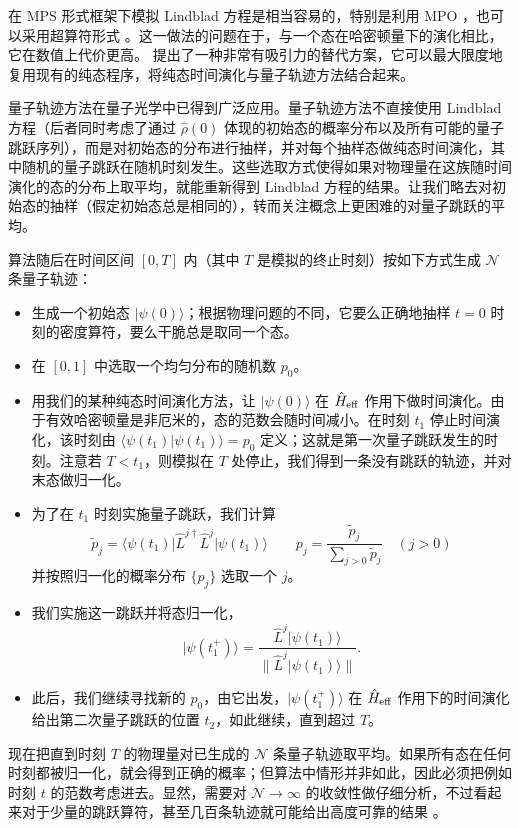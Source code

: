 \documentclass[a4paper,10pt,oneside,onecolumn,1p,times]{elsarticle}
\newcommand{\bra}[1]{\mbox{$\langle #1  |$}}
\newcommand{\ket}[1]{\mbox{$| #1  \rangle$}}
\newcommand{\braket}[2]{\mbox{$\langle #1  | #2 \rangle$}} 	%
\begin{document}
在 MPS 形式框架下模拟 Lindblad 方程是相当容易的，特别是利用 MPO \cite{VerstraeteRipoll04}，也可以采用超算符形式 \cite{VidalZwolak04}。这一做法的问题在于，与一个态在哈密顿量下的演化相比，它在数值上代价更高。\cite{Daley09} 提出了一种非常有吸引力的替代方案，它可以最大限度地复用现有的纯态程序，将纯态时间演化与量子轨迹方法结合起来。

量子轨迹方法在量子光学中已得到广泛应用\cite{Plenio98}。量子轨迹方法不直接使用 Lindblad 方程（后者同时考虑了通过 $\hat{\rho}(0)$ 体现的初始态的概率分布以及所有可能的量子跳跃序列），而是对初始态的分布进行抽样，并对每个抽样态做纯态时间演化，其中随机的量子跳跃在随机时刻发生。这些选取方式使得如果对物理量在这族随时间演化的态的分布上取平均，就能重新得到 Lindblad 方程的结果。让我们略去对初始态的抽样（假定初始态总是相同的），转而关注概念上更困难的对量子跳跃的平均。

算法随后在时间区间 $[0,T]$ 内（其中 $T$ 是模拟的终止时刻）按如下方式生成 ${\mathcal N}$ 条量子轨迹：
\begin{itemize}
\item 生成一个初始态 $\ket{\psi(0)}$；根据物理问题的不同，它要么正确地抽样 $t=0$ 时刻的密度算符，要么干脆总是取同一个态。
\item 在 $[0,1]$ 中选取一个均匀分布的随机数 $p_0$。
\item 用我们的某种纯态时间演化方法，让 $\ket{\psi(0)}$ 在 $\hat{H}_{{\rm eff}}$ 作用下做时间演化。由于有效哈密顿量是非厄米的，态的范数会随时间减小。在时刻 $t_1$ 停止时间演化，该时刻由
$\braket{\psi(t_1)}{\psi(t_1)} = p_0$ 定义；这就是第一次量子跳跃发生的时刻。注意若 $T<t_1$，则模拟在 $T$ 处停止，我们得到一条没有跳跃的轨迹，并对末态做归一化。
\item 为了在 $t_1$ 时刻实施量子跳跃，我们计算
\begin{equation}
\tilde{p}_j = \bra{\psi(t_1)} \hat{L}^{j\dagger} \hat{L}^j \ket{\psi(t_1)} \quad\quad p_j = \frac{\tilde{p}_j}{\sum_{j>0} \tilde{p}_j} \quad (j>0)
\end{equation}
并按照归一化的概率分布 $\{ p_j \}$ 选取一个 $j$。
\item 我们实施这一跳跃并将态归一化，
\begin{equation}
\ket{\psi(t_1^+)} = \frac{\hat{L}^j \ket{\psi(t_1)}}{\| \hat{L}^j \ket{\psi(t_1)} \|} .
\end{equation}
\item 此后，我们继续寻找新的 $p_0$，由它出发，$\ket{\psi(t_1^+)}$ 在 $\hat{H}_{{\rm eff}}$ 作用下的时间演化给出第二次量子跳跃的位置 $t_2$，如此继续，直到超过 $T$。
\end{itemize}
现在把直到时刻 $T$ 的物理量对已生成的 ${\mathcal N}$ 条量子轨迹取平均。如果所有态在任何时刻都被归一化，就会得到正确的概率；但算法中情形并非如此，因此必须把例如时刻 $t$ 的范数考虑进去。显然，需要对 ${\mathcal N} \rightarrow \infty$ 的收敛性做仔细分析，不过看起来对于少量的跳跃算符，甚至几百条轨迹就可能给出高度可靠的结果 \cite{Daley09}。
\end{document}
